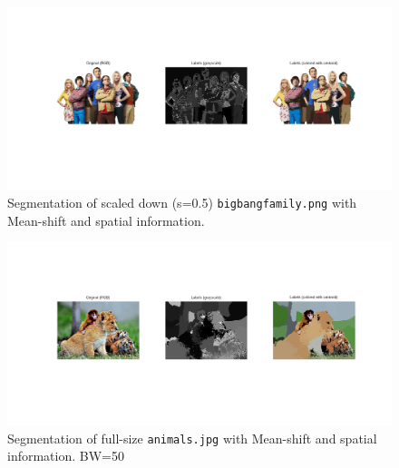 \begin{figure}[hbt]
\centering
\includegraphics[trim={50px 100px 50px 100px},clip,width=\textwidth]{img/mshift/bigbang_d30_spatial_scaled_down.png}
\caption{Segmentation of scaled down (s=0.5) \texttt{bigbangfamily.png} with Mean-shift and spatial information.}
\label{fig:bigbangfamily-d30-spatial}
\end{figure}

\begin{figure}[hbt]
\centering
\includegraphics[trim={50px 100px 50px 100px},clip,width=\textwidth]{img/mshift/animals_d50_spatial.png}
\caption{Segmentation of full-size \texttt{animals.jpg} with Mean-shift and spatial information. BW=50}
\label{fig:animals-d50-spatial}
\end{figure}
